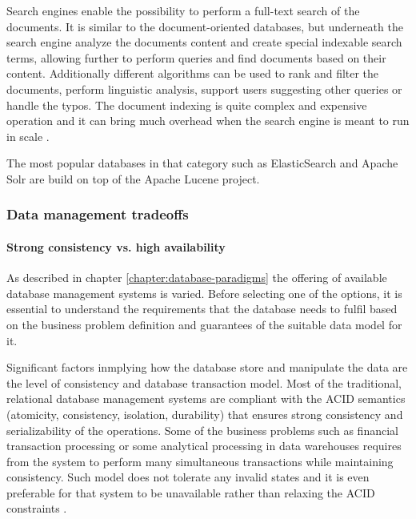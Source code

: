 Search engines enable the possibility to perform a full-text search of the documents. It is similar to the document-oriented databases, but underneath the search engine analyze the documents content and create special indexable search terms, allowing further to perform queries and find documents based on their content. Additionally different algorithms can be used to rank and filter the documents, perform linguistic analysis, support users suggesting other queries or handle the typos. The document indexing is quite complex and expensive operation and it can bring much overhead when the search engine is meant to run in scale \cite{DesignDataIntensiveApplications}. 

The most popular databases in that category such as ElasticSearch and Apache Solr are build on top of the Apache Lucene project.

\subsubsection{Data management tradeoffs}



\paragraph*{Strong consistency vs. high availability}

As described in chapter \ref{chapter:database-paradigms} the offering of available database management systems is varied. Before selecting one of the options, it is essential to understand the requirements that the database needs to fulfil based on the business problem definition and guarantees of the suitable data model for it. 

Significant factors inmplying how the database store and manipulate the data are the level of consistency and database transaction model. Most of the traditional, relational database management systems are compliant with the ACID semantics (atomicity, consistency, isolation, durability) that ensures strong consistency and serializability of the operations. Some of the business problems such as financial transaction processing or some analytical processing in data warehouses requires from the system to perform many simultaneous transactions while maintaining consistency. Such model does not tolerate any invalid states and it is even preferable for that system to be unavailable rather than relaxing the ACID constraints \cite{PerspectivesOnArchitectureEvolution}.


